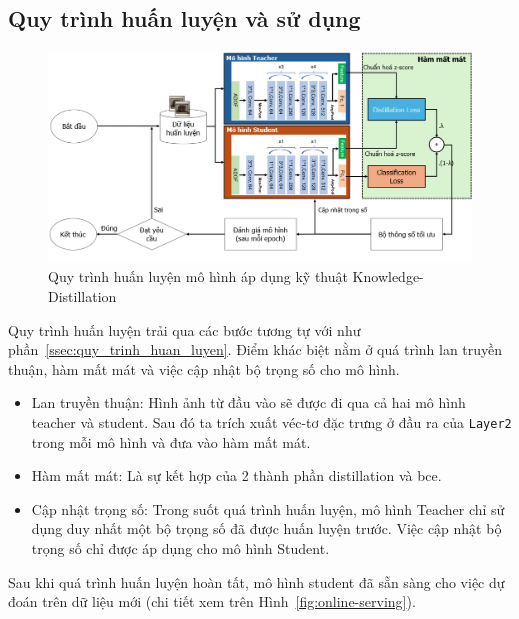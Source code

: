 \subsection{Quy trình huấn luyện và sử dụng}
%
\begin{figure}[h!]
	\centering
	\includegraphics[width=1.0\linewidth]{Images/offline-training-process-distillation.png}
	\begin{minipage}{1.0\linewidth}
		\vspace{5mm}
		\caption{Quy trình huấn luyện mô hình áp dụng kỹ thuật Knowledge-Distillation}
		\label{fig:offline-training-process-distillation}
	\end{minipage}
\end{figure}
%
%
Quy trình huấn luyện trải qua các bước tương tự với như phần~\ref{ssec:quy_trinh_huan_luyen}.
%
Điểm khác biệt nằm ở quá trình lan truyền thuận, hàm mất mát và việc cập nhật bộ trọng số cho mô hình.
%
\begin{itemize}
	\item Lan truyền thuận: Hình ảnh từ đầu vào sẽ được đi qua cả hai mô hình teacher và student. Sau đó ta trích xuất véc-tơ đặc trưng ở đầu ra của \texttt{Layer2} trong mỗi mô hình và đưa vào hàm mất mát.
	
	\item  Hàm mất mát: Là sự kết hợp của 2 thành phần \gls{distillation} và \gls{bce}.
	
	\item Cập nhật trọng số: Trong suốt quá trình huấn luyện, mô hình Teacher chỉ sử dụng duy nhất một bộ trọng số đã được huấn luyện trước. Việc cập nhật bộ trọng số chỉ được áp dụng cho mô hình Student.
\end{itemize}

Sau khi quá trình huấn luyện hoàn tất, mô hình student đã sẵn sàng cho việc dự đoán trên dữ liệu mới (chi tiết xem trên Hình~\ref{fig:online-serving}). 







